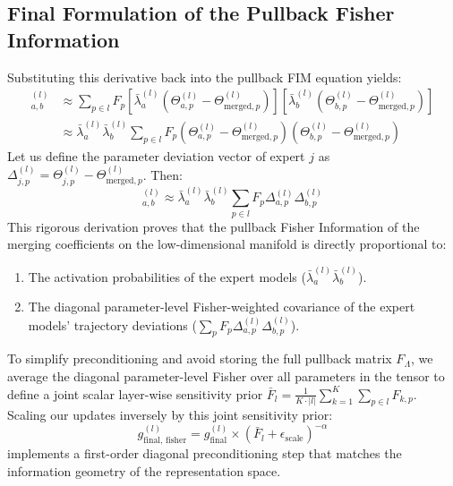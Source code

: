 \documentclass{article}
\theoremstyle{plain}
\theoremstyle{definition}
\theoremstyle{remark}
\begin{document}
\subsection{Final Formulation of the Pullback Fisher Information}
Substituting this derivative back into the pullback FIM equation yields:
\begin{align}
    [F_{\Lambda}]_{a, b}^{(l)} &\approx \sum_{p \in l} F_p \left[ \bar{\lambda}_a^{(l)} \left( \Theta_{a, p}^{(l)} - \Theta_{\text{merged}, p}^{(l)} \right) \right] \left[ \bar{\lambda}_b^{(l)} \left( \Theta_{b, p}^{(l)} - \Theta_{\text{merged}, p}^{(l)} \right) \right] \\
    &\approx \bar{\lambda}_a^{(l)} \bar{\lambda}_b^{(l)} \sum_{p \in l} F_p \left( \Theta_{a, p}^{(l)} - \Theta_{\text{merged}, p}^{(l)} \right) \left( \Theta_{b, p}^{(l)} - \Theta_{\text{merged}, p}^{(l)} \right)
\end{align}
Let us define the parameter deviation vector of expert $j$ as $\Delta_{j, p}^{(l)} = \Theta_{j, p}^{(l)} - \Theta_{\text{merged}, p}^{(l)}$. Then:
\begin{equation}
    [F_{\Lambda}]_{a, b}^{(l)} \approx \bar{\lambda}_a^{(l)} \bar{\lambda}_b^{(l)} \sum_{p \in l} F_p \Delta_{a, p}^{(l)} \Delta_{b, p}^{(l)}
\end{equation}
This rigorous derivation proves that the pullback Fisher Information of the merging coefficients on the low-dimensional manifold is directly proportional to:
\begin{enumerate}
    \item The activation probabilities of the expert models ($\bar{\lambda}_a^{(l)} \bar{\lambda}_b^{(l)}$).
    \item The diagonal parameter-level Fisher-weighted covariance of the expert models' trajectory deviations ($\sum_p F_p \Delta_{a, p}^{(l)} \Delta_{b, p}^{(l)}$).
\end{enumerate}

To simplify preconditioning and avoid storing the full pullback matrix $F_{\Lambda}$, we average the diagonal parameter-level Fisher over all parameters in the tensor to define a joint scalar layer-wise sensitivity prior $\bar{F}_l = \frac{1}{K \cdot |l|} \sum_{k=1}^K \sum_{p \in l} F_{k, p}$. Scaling our updates inversely by this joint sensitivity prior:
\begin{equation}
    g_{\text{final, fisher}}^{(l)} = g_{\text{final}}^{(l)} \times (\bar{F}_l + \epsilon_{\text{scale}})^{-\alpha}
\end{equation}
implements a first-order diagonal preconditioning step that matches the information geometry of the representation space.
\end{document}
